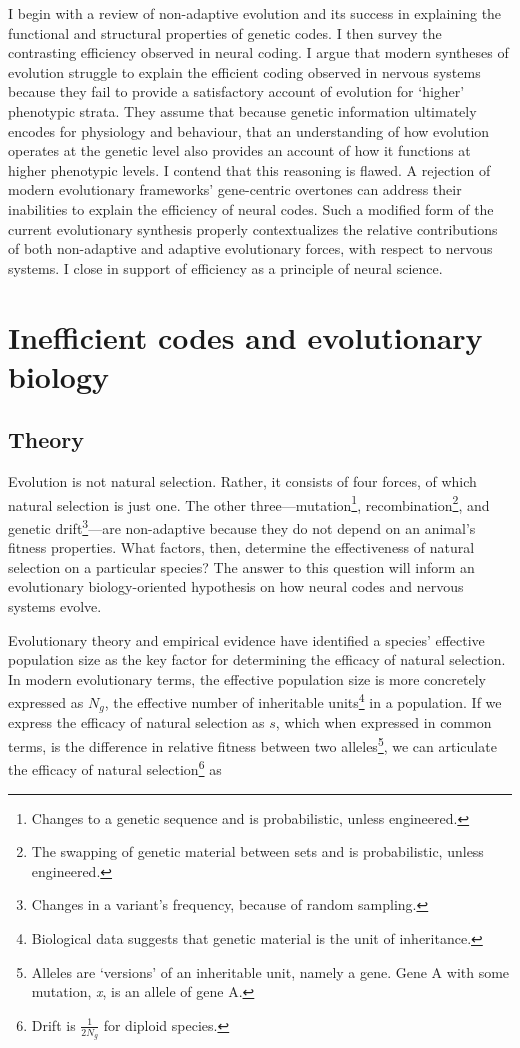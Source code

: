 \documentclass{article}
\begin{document}
I begin with a review of non-adaptive evolution and its success in explaining the functional and structural properties of genetic codes. I then survey the contrasting efficiency observed in neural coding. I argue that modern syntheses of evolution\cite{huxley2010evolution, kimura1983neutral} struggle to explain the efficient coding observed in nervous systems because they fail to provide a satisfactory account of evolution for `higher' phenotypic strata. They assume that because genetic information ultimately encodes for physiology and behaviour, that an understanding of how evolution operates at the genetic level also provides an account of how it functions at higher phenotypic levels. I contend that this reasoning is flawed. A rejection of modern evolutionary frameworks' gene-centric overtones can address their inabilities to explain the efficiency of neural codes. Such a modified form of the current evolutionary synthesis properly contextualizes the relative contributions of both non-adaptive and adaptive evolutionary forces, with respect to nervous systems. I close in support of efficiency as a principle of neural science.

\section{Inefficient codes and evolutionary biology}

\subsection{Theory}

Evolution is not natural selection. Rather, it consists of four forces, of which natural selection is just one. The other three---mutation\footnote{Changes to a genetic sequence and is probabilistic, unless engineered.}, recombination\footnote{The swapping of genetic material between sets and is probabilistic, unless engineered.}, and genetic drift\footnote{Changes in a variant's frequency, because of random sampling.}---are non-adaptive because they do not depend on an animal's fitness properties. What factors, then, determine the effectiveness of natural selection on a particular species? The answer to this question will inform an evolutionary biology-oriented hypothesis on how neural codes and nervous systems evolve.

Evolutionary theory and empirical evidence have identified a species' effective population size as the key factor for determining the efficacy of natural selection. In modern evolutionary terms, the effective population size is more concretely expressed as $N_g$, the effective number of inheritable units\footnote{Biological data suggests that genetic material is the unit of inheritance.} in a population. If we express the efficacy of natural selection as $s$, which when expressed in common terms, is the difference in relative fitness between two alleles\footnote{Alleles are `versions' of an inheritable unit, namely a gene. Gene A with some mutation, \textit{x}, is an allele of gene A.}, we can articulate the efficacy of natural selection\footnote{Drift is $\frac{1}{2N_g}$ for diploid species.} as
\end{document}
